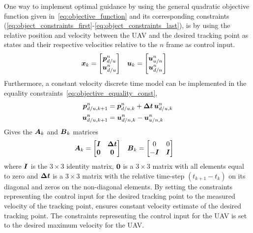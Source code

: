 One way to implement optimal guidance by using the general quadratic objective function given in~\ref{eq:objective_function} and its corresponding constraints (\ref{eq:object_constraints_first}-\ref{eq:object_constraints_last}), is by using the relative position and velocity between the \gls{UAV} and the desired tracking point as states and their respective velocities relative to the $n$ frame as control input.
\begin{align}\label{eq:objective_states_input}
	\boldsymbol{x}_k&=
	\begin{bmatrix}
		\boldsymbol{p}^n_{d/u}\\
		\boldsymbol{u}^n_{d/u}
	\end{bmatrix}
	&
	\boldsymbol{u}_k&=
	\begin{bmatrix}
		\boldsymbol{u}^n_{u/n}\\
		\boldsymbol{u}^n_{d/n}
	\end{bmatrix}
\end{align}
Furthermore, a constant velocity discrete time model can be implemented in the equality constraints~\ref{eq:objective_equality_const}, 
\begin{align}
	\boldsymbol{p}^n_{d/u,k+1}&=\boldsymbol{p}^n_{d/u,k}+ \boldsymbol{\Delta t}\,\boldsymbol{u}^n_{d/u,k} \\
	\boldsymbol{u}^n_{d/u,k+1}&=\boldsymbol{u}^n_{d/n,k}-\boldsymbol{u}^n_{u/n,k}
\end{align}
Gives the $\boldsymbol{A}_k$ and $\boldsymbol{B}_k$ matrices
\begin{align}\label{eq:objective_constraints_matrices}
	\boldsymbol{A}_k&=
	\begin{bmatrix}
		\boldsymbol{I} & \boldsymbol{\Delta t}\\
        \boldsymbol{0} & \boldsymbol{0}
	\end{bmatrix}
	&
	\boldsymbol{B}_k&=
	\begin{bmatrix}
		0 & 0 \\
        -\boldsymbol{I} & \boldsymbol{I}
	\end{bmatrix}
\end{align}
where $\boldsymbol{I}$ is the $3\times3$ identity matrix, $\boldsymbol{0}$ is a $3\times3$ matrix with all elements equal to zero and $\boldsymbol{\Delta t}$ is a $3\times3$ matrix with the relative time-step $(t_{k+1}-t_{k})$ on its diagonal and zeros on the non-diagonal elements. By setting the constraints representing the control input for the desired tracking point to the measured velocity of the tracking point, ensures constant velocity estimate of the desired tracking point. The constraints representing the control input for the \gls{UAV} is set to the desired maximum velocity for the \gls{UAV}. 

